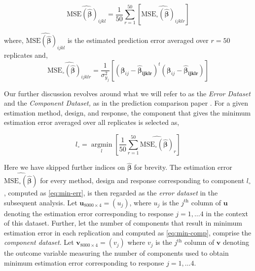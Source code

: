 \documentclass[12pt,3p,authoryear]{elsarticle}
\begin{document}
\begin{equation}
\widehat{\text{MSE}\left(\widehat{\boldsymbol{\beta}}\right)_{ijkl}} =
  \frac{1}{50}\sum_{r=1}^{50}{\left[
    \widehat{\text{MSE}_\circ\left(\widehat{\boldsymbol{\beta}}\right)_{ijklr}}  
  \right]}
\label{eq:estimated-est-error}
\end{equation}

where,
\(\widehat{\text{MSE}\left(\widehat{\boldsymbol{\beta}}\right)_{ijkl}}\)
is the estimated prediction error averaged over \(r=50\) replicates and,
\[\widehat{\text{MSE}_\circ\left(\boldsymbol{\widehat{\beta}}\right)_{ijklr}} = 
  \frac{1}{\sigma_{y_j}^2}\left[\left(\boldsymbol{\beta}_{ij} -\boldsymbol{\widehat{\beta}_{ijklr}}\right)^t\left(\boldsymbol{\beta}_{ij} - \boldsymbol{\widehat{\beta}_{ijklr}}\right)
\right]\]

Our further discussion revolves around what we will refer to as the
\emph{Error Dataset} and the \emph{Component Dataset,} as in the
prediction comparison paper \citet{rimal2019pred}. For a given
estimation method, design, and response, the component that gives the
minimum estimation error averaged over all replicates is selected as,

\begin{equation}
  l_\circ = \operatorname*{argmin}_{l}\left[\frac{1}{50}\sum_{r=1}^{50}{\widehat{\text{MSE}_\circ\left(\widehat{\boldsymbol{\beta}}\right)}_{r}}\right]
  \label{eq:min-err}
\end{equation}

Here we have skipped further indices on
\(\boldsymbol{\widehat{\boldsymbol{\beta}}}\) for brevity. The
estimation error
\(\widehat{\text{MSE}_\circ\left(\widehat{\boldsymbol{\beta}}\right)}\)
for every method, design and response corresponding to component
\(l_\circ\), computed as \eqref{eq:min-err}, is then regarded as the
\emph{error dataset} in the subsequent analysis. Let
\(\mathbf{u}_{8000\times4}=(u_j)\), where \(u_j\) is the \(j^\text{th}\)
column of \(\mathbf{u}\) denoting the estimation error corresponding to
response \(j=1, \ldots 4\) in the context of this dataset. Further, let
the number of components that result in minimum estimation error in each
replication and computed as \eqref{eq:min-comp}, comprise the
\emph{component dataset}. Let \(\mathbf{v}_{8000\times4}=(v_j)\) where
\(v_j\) is the \(j^\text{th}\) column of \(\mathbf{v}\) denoting the
outcome variable measuring the number of components used to obtain
minimum estimation error corresponding to response \(j=1, \ldots 4\).
\end{document}
